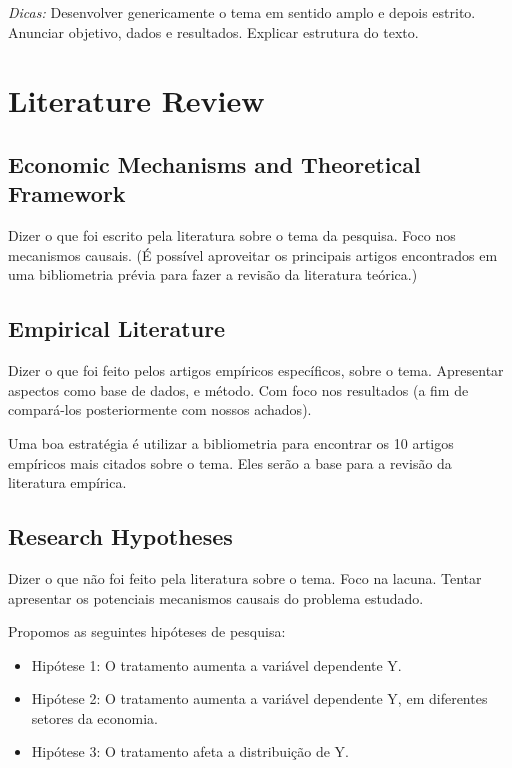 \documentclass[
  authoryear,
  preprint,
  3p,
  onecolumn]{elsarticle}
\providecommand{\tightlist}{%
  \setlength{\itemsep}{0pt}\setlength{\parskip}{0pt}}
\begin{document}
\emph{Dicas:} Desenvolver genericamente o tema em sentido amplo e depois
estrito. Anunciar objetivo, dados e resultados. Explicar estrutura do
texto.

\section{Literature Review}\label{literature-review}

\subsection{Economic Mechanisms and Theoretical
Framework}\label{economic-mechanisms-and-theoretical-framework}

Dizer o que foi escrito pela literatura sobre o tema da pesquisa. Foco
nos mecanismos causais. (É possível aproveitar os principais artigos
encontrados em uma bibliometria prévia para fazer a revisão da
literatura teórica.)

\subsection{Empirical Literature}\label{empirical-literature}

Dizer o que foi feito pelos artigos empíricos específicos, sobre o tema.
Apresentar aspectos como base de dados, e método. Com foco nos
resultados (a fim de compará-los posteriormente com nossos achados).

Uma boa estratégia é utilizar a bibliometria para encontrar os 10
artigos empíricos mais citados sobre o tema. Eles serão a base para a
revisão da literatura empírica.

\subsection{Research Hypotheses}\label{research-hypotheses}

Dizer o que não foi feito pela literatura sobre o tema. Foco na lacuna.
Tentar apresentar os potenciais mecanismos causais do problema estudado.

Propomos as seguintes hipóteses de pesquisa:

\begin{itemize}
\tightlist
\item
  Hipótese 1: O tratamento aumenta a variável dependente Y.
\item
  Hipótese 2: O tratamento aumenta a variável dependente Y, em
  diferentes setores da economia.
\item
  Hipótese 3: O tratamento afeta a distribuição de Y.
\end{itemize}
\end{document}
